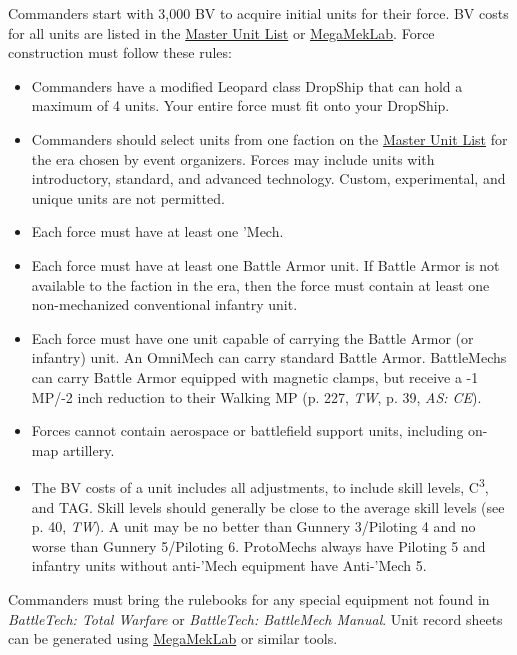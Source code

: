 Commanders start with 3,000 BV to acquire initial units for their force.
BV costs for all units are listed in the \href{http://www.masterunitlist.info}{Master Unit List} or \href{https://megamek.org}{MegaMekLab}.
Force construction must follow these rules:

\begin{itemize}

\item Commanders have a modified Leopard class DropShip that can hold a maximum of 4 units.
Your entire force must fit onto your DropShip.

\item Commanders should select units from one faction on the \href{http://www.masterunitlist.info/}{Master Unit List} for the era chosen by event organizers.
Forces may include units with introductory, standard, and advanced technology.
Custom, experimental, and unique units are not permitted.

\item Each force must have at least one 'Mech.

\item Each force must have at least one Battle Armor unit.
If Battle Armor is not available to the faction in the era, then the force must contain at least one non-mechanized conventional infantry unit.

\item Each force must have one unit capable of carrying the Battle Armor (or infantry) unit.
An OmniMech can carry standard Battle Armor.
BattleMechs can carry Battle Armor equipped with magnetic clamps, but receive a -1 MP/-2 inch reduction to their Walking MP (p. 227, \emph{TW}, p. 39, \emph{AS: CE}).

\item Forces cannot contain aerospace or battlefield support units, including on-map artillery.

\item The BV costs of a unit includes all adjustments, to include skill levels, C\textsuperscript{3}, and TAG.
Skill levels should generally be close to the average skill levels (see p. 40, \emph{TW}).
A unit may be no better than Gunnery 3/Piloting 4 and no worse than Gunnery 5/Piloting 6.
ProtoMechs always have Piloting 5 and infantry units without anti-'Mech equipment have Anti-'Mech 5.

\end{itemize}

Commanders must bring the rulebooks for any special equipment not found in \emph{BattleTech: Total Warfare} or \emph{BattleTech: BattleMech Manual}.
Unit record sheets can be generated using \href{https://megamek.org}{MegaMekLab} or similar tools.


